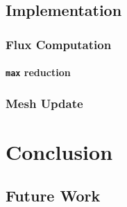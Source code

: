 \documentclass[9pt,twocolumn]{scrartcl}
\newcommand{\paragraphh}[1]{\paragraph{#1\hfill}\hfill

}
\begin{document}
\subsection{Implementation}
\subsubsection{Flux Computation}
\paragraphh{\texttt{max} reduction}
\subsubsection{Mesh Update}

\section{Conclusion}
\subsection{Future Work}


\end{document}
